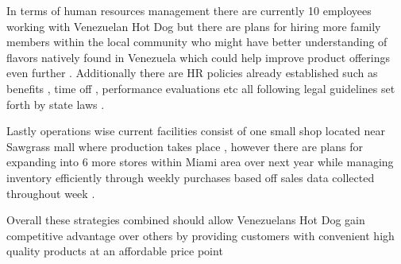 In terms of human resources management there are currently 10 employees working with Venezuelan Hot Dog but there are plans for hiring more family members within the local community who might have better understanding of flavors natively found in Venezuela which could help improve product offerings even further . Additionally there are HR policies already established such as benefits , time off , performance evaluations etc all following legal guidelines set forth by state laws .  

 Lastly operations wise current facilities consist of one small shop located near Sawgrass mall where production takes place , however there are plans for expanding into 6 more stores within Miami area over next year while managing inventory efficiently through weekly purchases based off sales data collected throughout week . 

 Overall these strategies combined should allow Venezuelans Hot Dog gain competitive advantage over others by providing customers with convenient high quality products at an affordable price point